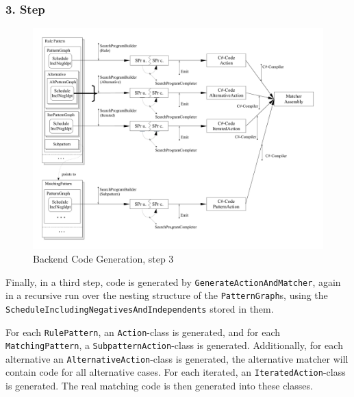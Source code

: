\subsubsection*{3. Step}

\begin{figure}[htbp]
  \centering
  \includegraphics[width=\textwidth]{fig/AblaufCodeerzeugungBackend3}
  \caption{Backend Code Generation, step 3}
  \label{figbackendcodegen3}
\end{figure}

Finally, in a third step, code is generated by \texttt{Generate\-Action\-And\-Matcher},
again in a recursive run over the nesting structure of the \texttt{Pattern\-Graph}s, 
using the \texttt{Schedule\-Including\-Negatives\-And\-Independents} stored in them. 

For each \texttt{Rule\-Pattern}, an \texttt{Action}-class is generated, 
and for each \texttt{Matching\-Pattern}, a \texttt{Subpattern\-Action}-class is generated.
Additionally, for each alternative an \texttt{Alternative\-Action}-class is generated,
the alternative matcher will contain code for all alternative cases.
For each iterated, an \texttt{Iterated\-Action}-class is generated.
The real matching code is then generated into these classes.

